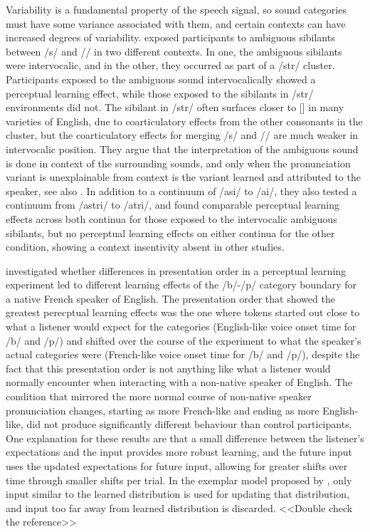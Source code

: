 Variability is a fundamental property of the speech signal, so sound categories must have some variance associated with them, and certain contexts can have increased degrees of variability.
\citet{Kraljic2008a} exposed participants to ambiguous sibilants between /s/ and /\textesh/ in two different contexts.  
In one, the ambiguous sibilants were intervocalic, and in the other, they occurred as part of a /str/ cluster.  
Participants exposed to the ambiguous sound intervocalically showed a perceptual learning effect, while those exposed to the sibilants in /str/ environments did not.  
The sibilant in /str/ often surfaces closer to [\textesh] in many varieties of English, due to coarticulatory effects from the other consonants in the cluster, but the coarticulatory effects for merging /s/ and /\textesh/ are much weaker in intervocalic position.  
They argue that the interpretation of the ambiguous sound is done in context of the surrounding sounds, and only when the pronunciation variant is unexplainable from context is the variant learned and attributed to the speaker, see also \citet{Kraljic2008}.  
In addition to a continuum of /asi/ to /a\textesh i/, they also tested a continuum from /astri/ to /a\textesh tri/, and found comparable perceptual learning effects across both continua for those exposed to the intervocalic ambiguous sibilants, but no perceptual learning effects on either continua for the other condition, showing a context insentivity absent in other studies.

%
\citet{Sumner2011} investigated whether differences in presentation order in a perceptual learning experiment led to different learning effects of the /b/-/p/ category boundary for a native French speaker of English.  
The presentation order that showed the greatest perecptual learning effects was the one where tokens started out close to what a listener would expect for the categories (English-like voice onset time for /b/ and /p/) and shifted over the course of the experiment to what the speaker's actual categories were (French-like voice onset time for /b/ and /p/), despite the fact that this presentation order is not anything like what a listener would normally encounter when interacting with a non-native speaker of English.  
The condition that mirrored the more normal course of non-native speaker pronunciation changes, starting as more French-like and ending as more English-like, did not produce significantly different behaviour than control participants.  
One explanation for these results are that a small difference between the listener's expectations and the input provides more robust learning, and the future input uses the updated expectations for future input, allowing for greater shifts over time through smaller shifts per trial.  
In the exemplar model proposed by \citet{Pierrehumbert2002}, only input similar to the learned distribution is used for updating that distribution, and input too far away from learned distribution is discarded. <<Double check the reference>>

